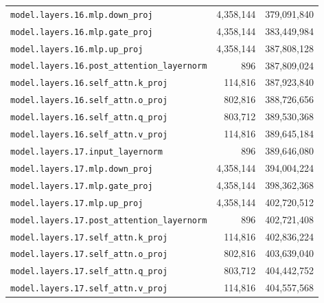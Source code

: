\documentclass[10pt,a4paper]{article}
\theoremstyle{definition}
\begin{document}
\begin{appendices}
\begin{longtable}{p{9.5cm}rr}
\texttt{model.\allowbreak{}layers.\allowbreak{}16.\allowbreak{}mlp.\allowbreak{}down\_proj} & 4,358,144 & 379,091,840 \\
\texttt{model.\allowbreak{}layers.\allowbreak{}16.\allowbreak{}mlp.\allowbreak{}gate\_proj} & 4,358,144 & 383,449,984 \\
\texttt{model.\allowbreak{}layers.\allowbreak{}16.\allowbreak{}mlp.\allowbreak{}up\_proj} & 4,358,144 & 387,808,128 \\
\texttt{model.\allowbreak{}layers.\allowbreak{}16.\allowbreak{}post\_attention\_layernorm} & 896 & 387,809,024 \\
\texttt{model.\allowbreak{}layers.\allowbreak{}16.\allowbreak{}self\_attn.\allowbreak{}k\_proj} & 114,816 & 387,923,840 \\
\texttt{model.\allowbreak{}layers.\allowbreak{}16.\allowbreak{}self\_attn.\allowbreak{}o\_proj} & 802,816 & 388,726,656 \\
\texttt{model.\allowbreak{}layers.\allowbreak{}16.\allowbreak{}self\_attn.\allowbreak{}q\_proj} & 803,712 & 389,530,368 \\
\texttt{model.\allowbreak{}layers.\allowbreak{}16.\allowbreak{}self\_attn.\allowbreak{}v\_proj} & 114,816 & 389,645,184 \\
\texttt{model.\allowbreak{}layers.\allowbreak{}17.\allowbreak{}input\_layernorm} & 896 & 389,646,080 \\
\texttt{model.\allowbreak{}layers.\allowbreak{}17.\allowbreak{}mlp.\allowbreak{}down\_proj} & 4,358,144 & 394,004,224 \\
\texttt{model.\allowbreak{}layers.\allowbreak{}17.\allowbreak{}mlp.\allowbreak{}gate\_proj} & 4,358,144 & 398,362,368 \\
\texttt{model.\allowbreak{}layers.\allowbreak{}17.\allowbreak{}mlp.\allowbreak{}up\_proj} & 4,358,144 & 402,720,512 \\
\texttt{model.\allowbreak{}layers.\allowbreak{}17.\allowbreak{}post\_attention\_layernorm} & 896 & 402,721,408 \\
\texttt{model.\allowbreak{}layers.\allowbreak{}17.\allowbreak{}self\_attn.\allowbreak{}k\_proj} & 114,816 & 402,836,224 \\
\texttt{model.\allowbreak{}layers.\allowbreak{}17.\allowbreak{}self\_attn.\allowbreak{}o\_proj} & 802,816 & 403,639,040 \\
\texttt{model.\allowbreak{}layers.\allowbreak{}17.\allowbreak{}self\_attn.\allowbreak{}q\_proj} & 803,712 & 404,442,752 \\
\texttt{model.\allowbreak{}layers.\allowbreak{}17.\allowbreak{}self\_attn.\allowbreak{}v\_proj} & 114,816 & 404,557,568 \\

\end{longtable}
\end{appendices}
\end{document}
